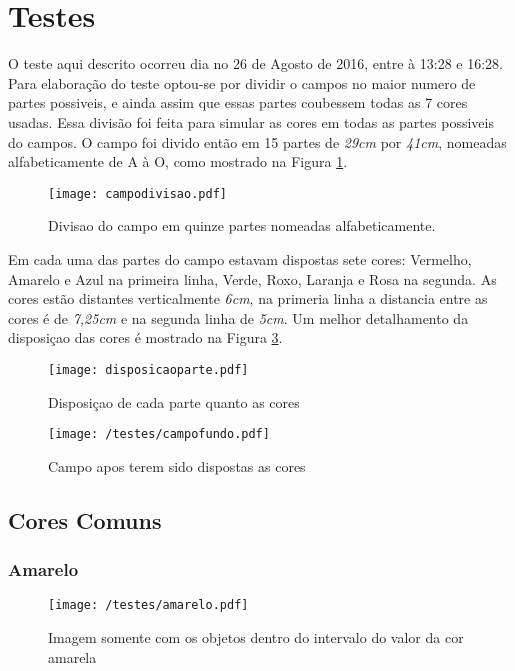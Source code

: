  \section{Testes}
O teste aqui descrito ocorreu dia no 26 de Agosto de 2016, entre à 13:28 e 16:28.
Para elaboração do teste optou-se por dividir o campos no maior numero de partes possiveis, e ainda assim que essas partes coubessem todas as 7 cores usadas. Essa divisão foi feita para simular as cores em todas as partes possiveis do campos. O campo foi divido então em 15 partes de \textit{29cm} por \textit{41cm}, nomeadas alfabeticamente de A à O, como mostrado na Figura \ref{campodivisao}.

\begin{figure}[H]
		\centering
		\texttt{[image: campodivisao.pdf]}
		\caption{Divisao do campo em quinze partes nomeadas alfabeticamente.}
		\label{campodivisao}
	\end{figure}
	
Em cada uma das partes do campo estavam dispostas sete cores: Vermelho, Amarelo e Azul na primeira linha, Verde, Roxo, Laranja e Rosa na segunda. As cores estão distantes verticalmente \textit{6cm}, na primeria linha a distancia entre as cores é de \textit{7,25cm} e na segunda linha de \textit{5cm}. Um  melhor detalhamento da disposiçao das cores é  mostrado na Figura \ref{disposicaoparte}.


\begin{figure}[H]
\begin{minipage}[b]{0.45\linewidth}
\centering
\texttt{[image: disposicaoparte.pdf]}
\caption{Disposiçao de cada parte quanto as cores}
\label{fig:figure1}
\end{minipage}
\hspace{0.5cm}
\begin{minipage}[b]{0.45\linewidth}
\centering
\texttt{[image: /testes/campofundo.pdf]}
\caption{Campo apos terem sido dispostas as cores}
\label{fig:figure2}
\end{minipage}
\end{figure}

\subsection{Cores Comuns}
\subsubsection{Amarelo}
	\begin{figure}[H]
		\centering
		\texttt{[image: /testes/amarelo.pdf]}
		\caption{Imagem somente com os objetos dentro do intervalo do valor da cor amarela}
		\label{disposicaoparte}
	\end{figure}
	
